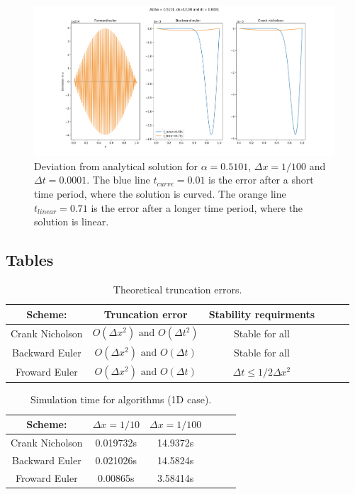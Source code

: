 \documentclass{article}
\begin{document}
\begin{figure}[H]
	\centering
	\includegraphics[width=180mm]{1_100_a}
	\caption{Deviation from analytical solution for $\alpha=0.5101$, $\Delta x=1/100$ and $\Delta t =0.0001$. The blue line $t_{curve}=0.01$ is the error after a short time period, where the solution is curved. The orange line $t_{linear}=0.71$ is the error after a longer time period, where the solution is linear.}
	\label{fig:1_100_a}
\end{figure}

\subsection{Tables}


\begin{table}[H]
\begin{center}
\caption{Theoretical truncation errors.}
\begin{tabular}{  |c|c|c|c|c|c| } \hline
Scheme:&	Truncation error&Stability requirments \\ \hline
Crank Nicholson&$O(\Delta x^2) \text{ and } O(\Delta t^2)$&Stable for all\\ \hline
Backward Euler&$O(\Delta x^2)  \text{ and } O(\Delta t)$&Stable for all\\ \hline
Froward Euler&$O(\Delta x^2)  \text{ and } O(\Delta t)$&$\Delta t \leq 1/2\Delta x^2$\\ \hline
\end{tabular}
\label{tab:a}
\end{center}
\end{table}

\begin{table}[H]
\begin{center}
\caption{Simulation time for algorithms (1D case).}
\begin{tabular}{  |c|c|c|c|c|c| } \hline
Scheme:&	$\Delta x = 1/10$&$\Delta x = 1/100$ \\ \hline
Crank Nicholson&0.019732s&14.9372s\\ \hline
Backward Euler&0.021026s&14.5824s\\ \hline
Froward Euler&	0.00865s&3.58414s\\ \hline
\end{tabular}
\label{tab:time}
\end{center}
\end{table}
\end{document}
